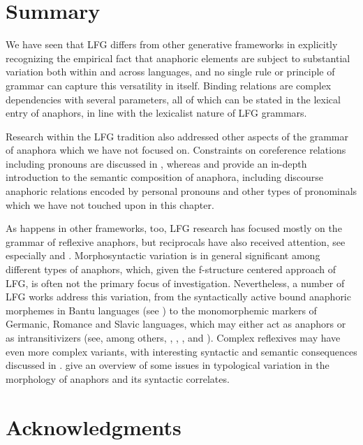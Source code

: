 \documentclass[output=paper,hidelinks]{langscibook}
\begin{document}
\section{Summary}
\label{sec:Anaphora:6}

We have seen that LFG differs from other generative frameworks in explicitly recognizing the empirical fact that anaphoric elements are subject to substantial variation both within and across languages, and no single rule or principle of grammar can capture this versatility in itself. Binding relations are complex dependencies with several parameters, all of which can be stated in the lexical entry of anaphors, in line with the lexicalist nature of LFG grammars.

Research within the LFG tradition also addressed other aspects of the grammar of anaphora which we have not focused on. Constraints on coreference relations including pronouns are discussed in \citet{BresnanEtAl2016}, whereas \citet{DalrympleAl17} and \citet{DLM:LFG} provide an in-depth introduction to the semantic composition of anaphora, including discourse anaphoric relations encoded by personal pronouns and other types of pronominals which we have not touched upon in this chapter.

As happens in other frameworks, too, LFG research has focused mostly on the grammar of reflexive anaphors, but reciprocals have also received attention, see especially \citet{Hurst:Syntaxa,Hurst2010,Hurst:PhD} and \citet{HurstNordlinger2021}. Morphosyntactic variation is in general significant among different types of anaphors, which, given the f-structure centered approach of LFG, is often not the primary focus of investigation. Nevertheless, a number of LFG works address this variation, from the syntactically active bound anaphoric morphemes in Bantu languages (see ) to the monomorphemic markers of Germanic, Romance and Slavic languages, which may either act as anaphors or as intransitivizers (see, among others, \citealt{Sells1987-xz}, \citealt{AlencarKelling2005}, , and ). Complex reflexives may have even more complex variants, with interesting syntactic and semantic consequences discussed in \citet{Rakosi2009}. \citet{BresnanEtAl2016} give an overview of some issues in typological variation in the morphology of anaphors and its syntactic correlates.


\section*{Acknowledgments}
\end{document}
